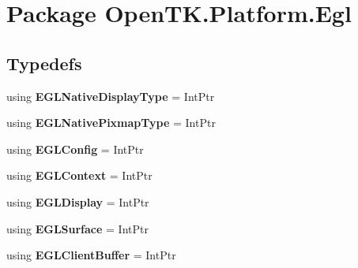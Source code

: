 \hypertarget{namespace_open_t_k_1_1_platform_1_1_egl}{\section{Package Open\-T\-K.\-Platform.\-Egl}
\label{namespace_open_t_k_1_1_platform_1_1_egl}
}
\subsection*{Typedefs}
\begin{DoxyCompactItemize}
\item 
\hypertarget{namespace_open_t_k_1_1_platform_1_1_egl_af66b19957f7aab9df9bd89b6651adbd7}{using {\bfseries E\-G\-L\-Native\-Display\-Type} = Int\-Ptr}\label{namespace_open_t_k_1_1_platform_1_1_egl_af66b19957f7aab9df9bd89b6651adbd7}

\item 
\hypertarget{namespace_open_t_k_1_1_platform_1_1_egl_a5a104871815b9affec975b9e60c78c6b}{using {\bfseries E\-G\-L\-Native\-Pixmap\-Type} = Int\-Ptr}\label{namespace_open_t_k_1_1_platform_1_1_egl_a5a104871815b9affec975b9e60c78c6b}

\item 
\hypertarget{namespace_open_t_k_1_1_platform_1_1_egl_a9f6d4f87f60ff4fa110f4f725c063c9a}{using {\bfseries E\-G\-L\-Config} = Int\-Ptr}\label{namespace_open_t_k_1_1_platform_1_1_egl_a9f6d4f87f60ff4fa110f4f725c063c9a}

\item 
\hypertarget{namespace_open_t_k_1_1_platform_1_1_egl_ae1e8a12ac7da980c976bdd5efc78c169}{using {\bfseries E\-G\-L\-Context} = Int\-Ptr}\label{namespace_open_t_k_1_1_platform_1_1_egl_ae1e8a12ac7da980c976bdd5efc78c169}

\item 
\hypertarget{namespace_open_t_k_1_1_platform_1_1_egl_a43f95abdfe9777c6c9012be951eabd96}{using {\bfseries E\-G\-L\-Display} = Int\-Ptr}\label{namespace_open_t_k_1_1_platform_1_1_egl_a43f95abdfe9777c6c9012be951eabd96}

\item 
\hypertarget{namespace_open_t_k_1_1_platform_1_1_egl_aa44952b205ba01eda53c9d92e568b0c7}{using {\bfseries E\-G\-L\-Surface} = Int\-Ptr}\label{namespace_open_t_k_1_1_platform_1_1_egl_aa44952b205ba01eda53c9d92e568b0c7}

\item 
\hypertarget{namespace_open_t_k_1_1_platform_1_1_egl_ae96cf499215f0d4e8e00da6a0586d309}{using {\bfseries E\-G\-L\-Client\-Buffer} = Int\-Ptr}\label{namespace_open_t_k_1_1_platform_1_1_egl_ae96cf499215f0d4e8e00da6a0586d309}

\end{DoxyCompactItemize}
